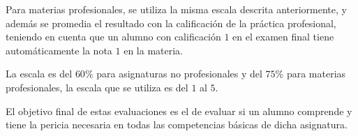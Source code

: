 
Para materias profesionales, se utiliza la misma escala descrita anteriormente,
y además se promedia el resultado con la calificación de la práctica
profesional\cite{iab:est_enfemeria}, teniendo en cuenta que un alumno con
calificación $1$ en el examen final tiene automáticamente la nota $1$ en la
materia\cite{iab:est_enfemeria}.

La escala es del $60\%$ para asignaturas no profesionales y del $75\%$ para
materias profesionales, la escala que se utiliza es del $1$ al $5$.

El objetivo final de estas evaluaciones es el de evaluar si un alumno comprende
y tiene la pericia necesaria en todas las competencias básicas de dicha
asignatura.
